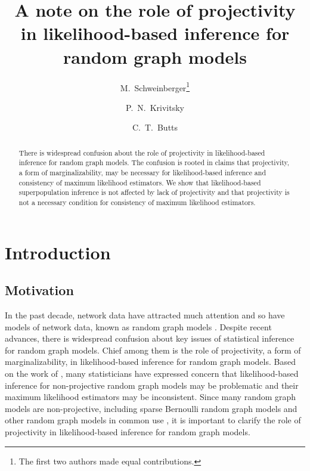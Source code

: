 \documentclass[12pt]{article}
\begin{document}
\title{A note on the role of projectivity in likelihood-based inference for random graph models}

\author{M.\ Schweinberger\footnote{The first two authors made equal contributions.}
\and P.\ N.\ Krivitsky
\and C.\ T.\ Butts}

\date{}

\maketitle

\begin{abstract}
There is widespread confusion about the role of projectivity in likelihood-based inference for random graph models.
The confusion is rooted in claims that projectivity,
a form of marginalizability,
may be necessary for likelihood-based inference and consistency of maximum likelihood estimators.
We show that likelihood-based superpopulation inference is not affected by lack of projectivity and that projectivity is not a necessary condition for consistency of maximum likelihood estimators. 
\end{abstract}

\section{Introduction}
\label{intro}

\subsection{Motivation}

In the past decade,
network data have attracted much attention and so have models of network data,
known as random graph models \citep[][]{Fien12,HuKrSc12}.
Despite recent advances,
there is widespread confusion about key issues of statistical inference for random graph models.
Chief among them is the role of projectivity, 
a form of marginalizability,
in likelihood-based inference for random graph models.
Based on the work of \citet{ShRi11},
many statisticians have expressed concern that likelihood-based inference for non-projective random graph models may be problematic and their maximum likelihood estimators may be inconsistent.
Since many random graph models are non-projective,
including sparse Bernoulli random graph models \citep{ErRe60} and other random graph models in common use \citep{HuKrSc12},
it is important to clarify the role of projectivity in likelihood-based inference for random graph models. 
\end{document}
